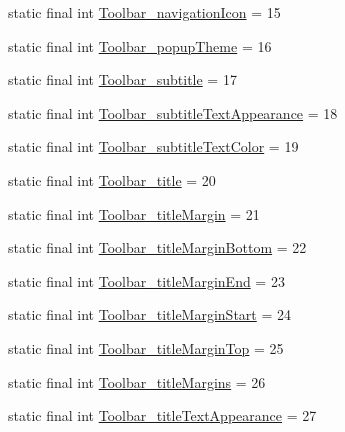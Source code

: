 \begin{DoxyCompactItemize}
\item 
static final int \mbox{\hyperlink{classcom_1_1google_1_1android_1_1gms_1_1R_1_1styleable_ac35fc859d6c83dcc05024e3ab17b3385}{Toolbar\+\_\+navigation\+Icon}} = 15
\item 
static final int \mbox{\hyperlink{classcom_1_1google_1_1android_1_1gms_1_1R_1_1styleable_a8bbb50b5f9cc25e698811059778ee4ac}{Toolbar\+\_\+popup\+Theme}} = 16
\item 
static final int \mbox{\hyperlink{classcom_1_1google_1_1android_1_1gms_1_1R_1_1styleable_ae925e0e09956a13baa50516c723ff7e6}{Toolbar\+\_\+subtitle}} = 17
\item 
static final int \mbox{\hyperlink{classcom_1_1google_1_1android_1_1gms_1_1R_1_1styleable_a2c9e00258fb6a2faf3606f79af2c22fd}{Toolbar\+\_\+subtitle\+Text\+Appearance}} = 18
\item 
static final int \mbox{\hyperlink{classcom_1_1google_1_1android_1_1gms_1_1R_1_1styleable_aaed617695b88e886ea4235208b9cda43}{Toolbar\+\_\+subtitle\+Text\+Color}} = 19
\item 
static final int \mbox{\hyperlink{classcom_1_1google_1_1android_1_1gms_1_1R_1_1styleable_a43b0515ef514b98d2e21b0a056a700b3}{Toolbar\+\_\+title}} = 20
\item 
static final int \mbox{\hyperlink{classcom_1_1google_1_1android_1_1gms_1_1R_1_1styleable_afa872789bfc54bff16c80829018f383e}{Toolbar\+\_\+title\+Margin}} = 21
\item 
static final int \mbox{\hyperlink{classcom_1_1google_1_1android_1_1gms_1_1R_1_1styleable_af22e10f91a4057d61f0e3989ac7dca7c}{Toolbar\+\_\+title\+Margin\+Bottom}} = 22
\item 
static final int \mbox{\hyperlink{classcom_1_1google_1_1android_1_1gms_1_1R_1_1styleable_a7cfda1776bf88946e4971318d162c8e8}{Toolbar\+\_\+title\+Margin\+End}} = 23
\item 
static final int \mbox{\hyperlink{classcom_1_1google_1_1android_1_1gms_1_1R_1_1styleable_ae67fda63977c774b12dd6988800a46d9}{Toolbar\+\_\+title\+Margin\+Start}} = 24
\item 
static final int \mbox{\hyperlink{classcom_1_1google_1_1android_1_1gms_1_1R_1_1styleable_ac357433dbe6bd20c5dc9e2217d7957ba}{Toolbar\+\_\+title\+Margin\+Top}} = 25
\item 
static final int \mbox{\hyperlink{classcom_1_1google_1_1android_1_1gms_1_1R_1_1styleable_aa7d0cb73de4037239d0ab3cd891a69cd}{Toolbar\+\_\+title\+Margins}} = 26
\item 
static final int \mbox{\hyperlink{classcom_1_1google_1_1android_1_1gms_1_1R_1_1styleable_a58fa2ab999a221b8f8427da977d8615a}{Toolbar\+\_\+title\+Text\+Appearance}} = 27

\end{DoxyCompactItemize}
